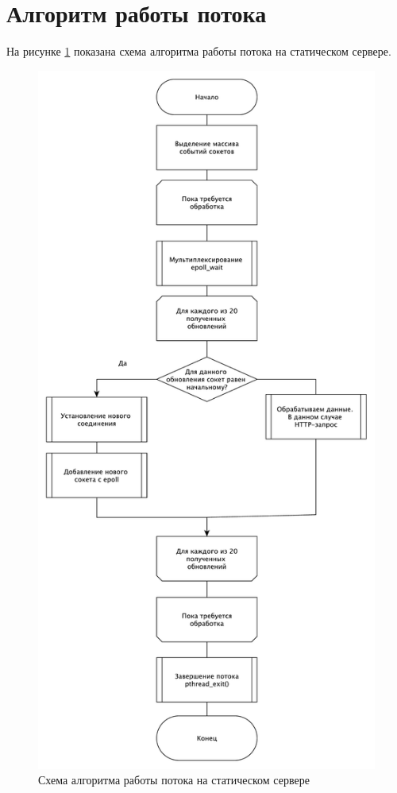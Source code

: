\newpage

\section{Алгоритм работы потока}
На рисунке \ref{img:algo} показана схема алгоритма работы потока на статическом сервере.

\begin{figure}[h!]
    \centering
    \includegraphics[scale=0.4]{algo.pdf}
    \caption{Схема алгоритма работы потока на статическом сервере}
    \label{img:algo}
\end{figure}
